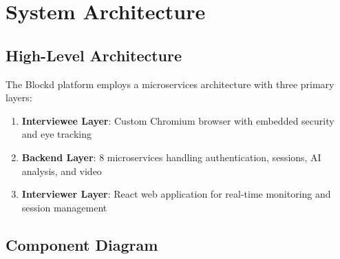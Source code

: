 \documentclass[11pt,letterpaper]{article}
\begin{document}
\section{System Architecture}

\subsection{High-Level Architecture}

The Blockd platform employs a microservices architecture with three primary layers:

\begin{enumerate}
    \item \textbf{Interviewee Layer}: Custom Chromium browser with embedded security and eye tracking
    \item \textbf{Backend Layer}: 8 microservices handling authentication, sessions, AI analysis, and video
    \item \textbf{Interviewer Layer}: React web application for real-time monitoring and session management
\end{enumerate}

\subsection{Component Diagram}
\end{document}
